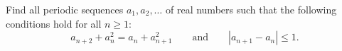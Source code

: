 Find all periodic sequences $a_1, a_2, \ldots$ of real numbers such that the following conditions hold for all $n \geq 1$:
\[ a_{n+2} + a_n^2 = a_n + a_{n+1}^2 \qquad \text{and} \qquad |a_{n+1} - a_n| \leq 1. \]
